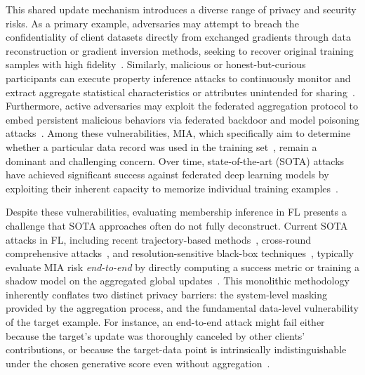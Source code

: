 \documentclass[bdcc,article,submit,pdftex]{Definitions/mdpi}
\begin{document}
This shared update mechanism introduces a diverse range of privacy and security risks. As a primary example, adversaries may attempt to breach the confidentiality of client datasets directly from exchanged gradients through data reconstruction or gradient inversion methods, seeking to recover original training samples with high fidelity~\cite{zhu2019deep,geiping2020inverting}. Similarly, malicious or honest-but-curious participants can execute property inference attacks to continuously monitor and extract aggregate statistical characteristics or attributes unintended for sharing~\cite{melis2019exploiting,wang2019beyond}. Furthermore, active adversaries may exploit the federated aggregation protocol to embed persistent malicious behaviors via federated backdoor and model poisoning attacks~\cite{bagdasaryan2020how}. Among these vulnerabilities, MIA, which specifically aim to determine whether a particular data record was used in the training set~\cite{shokri2017membership,yeom2018privacy}, remain a dominant and challenging concern. Over time, state-of-the-art (SOTA) attacks have achieved significant success against federated deep learning models by exploiting their inherent capacity to memorize individual training examples~\cite{nasr2019comprehensive,carlini2022membership}.

Despite these vulnerabilities, evaluating membership inference in FL presents a challenge that SOTA approaches often do not fully deconstruct. Current SOTA attacks in FL, including recent trajectory-based methods~\cite{zhang2024ltmia}, cross-round comprehensive attacks~\cite{hu2024fedmia}, and resolution-sensitive black-box techniques~\cite{xiao2025resmia}, typically evaluate MIA risk \emph{end-to-end} by directly computing a success metric or training a shadow model on the aggregated global updates~\cite{nasr2019comprehensive,melis2019exploiting,yin2021comprehensive,hu2024fedmia,zhang2024ltmia,xiao2025resmia}. This monolithic methodology inherently conflates two distinct privacy barriers: the system-level masking provided by the aggregation process, and the fundamental data-level vulnerability of the target example. For instance, an end-to-end attack might fail either because the target's update was thoroughly canceled by other clients' contributions, or because the target-data point is intrinsically indistinguishable under the chosen generative score even without aggregation~\cite{Galende2025Membership,carlini2022membership}.
\end{document}
